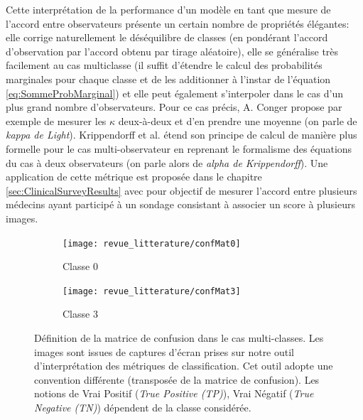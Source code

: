Cette interprétation de la performance d'un modèle en tant que mesure de l'accord entre observateurs présente un certain nombre de propriétés élégantes: elle corrige naturellement le déséquilibre de classes (en pondérant l'accord d'observation par l'accord obtenu par tirage aléatoire), elle se généralise très facilement au cas multiclasse (il suffit d'étendre le calcul des probabilités marginales pour chaque classe et de les additionner à l'instar de l'équation \ref{eq:SommeProbMarginal}) et elle peut également s'interpoler dans le cas d'un plus grand nombre d'observateurs. Pour ce cas précis, A. Conger \cite{congerIntegrationGeneralizationKappas1980} propose par exemple de mesurer les $\kappa$ deux-à-deux et d'en prendre une moyenne (on parle de \textit{kappa de Light}). Krippendorff et al. \cite{shelley_krippendorff_1984} étend son principe de calcul de manière plus formelle pour le cas multi-observateur en reprenant le formalisme des équations du cas à deux observateurs (on parle alors de \textit{alpha de Krippendorff}). Une application de cette métrique est proposée dans le chapitre \ref{sec:ClinicalSurveyResults} avec pour objectif de mesurer l'accord entre plusieurs médecins ayant participé à un sondage consistant à associer un score à plusieurs images.

\begin{figure}[h]
	\centering
	\hspace{3em}
	\begin{subfigure}{0.3\textwidth}
		\texttt{[image: revue\_litterature/confMat0]}
		\caption{Classe 0}
	\end{subfigure}
	\hfill
	\begin{subfigure}{0.3\textwidth}
		\texttt{[image: revue\_litterature/confMat3]}
		\caption{Classe 3}
	\end{subfigure}
\hspace{3em}
\caption{Définition de la matrice de confusion dans le cas multi-classes. Les images sont issues de captures d'écran prises sur notre outil d'interprétation des métriques de classification. Cet outil adopte une convention différente (transposée de la matrice de confusion). Les notions de Vrai Positif (\textit{True Positive (TP)}), Vrai Négatif (\textit{True Negative (TN)}) dépendent de la classe considérée.}
\label{fig:multiClassConfMatTool}
\end{figure}

